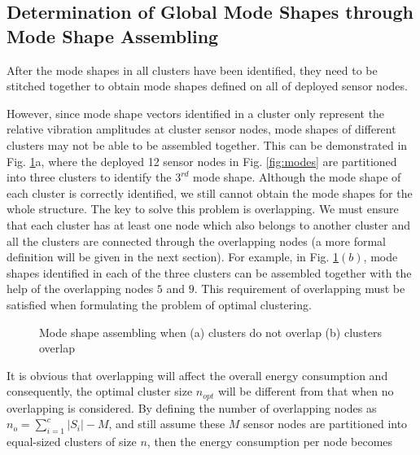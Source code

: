 \subsection{Determination of Global Mode Shapes through Mode Shape Assembling}
After the mode shapes in all clusters have been identified, they need to be stitched together to obtain mode shapes defined on all of deployed sensor nodes. 

However, since mode shape vectors identified in a cluster only represent the relative vibration amplitudes at cluster sensor nodes, mode shapes of different clusters may not be able to be assembled together. This can be demonstrated in Fig. \ref{fig:TwoTypesClustering}a, where the deployed 12 sensor nodes in Fig. \ref{fig:modes} are partitioned into three clusters to identify the \(3^{rd}\) mode shape.  Although the mode shape of each cluster is correctly identified, we still cannot obtain the mode shapes for the whole structure. The key to solve this problem is overlapping.  We must ensure that each cluster has at least one node which also belongs to another cluster and all the clusters are connected through the overlapping nodes (a more formal definition will be given in the next section).  For example, in Fig. \ref{fig:TwoTypesClustering}\((b)\), mode shapes identified in each of the three clusters can be assembled together with the help of the overlapping nodes \(5\) and \(9\). This requirement of overlapping must be satisfied when formulating the problem of optimal clustering.

\begin{figure}
\centering
\subfloat[]{\label{fig:NonOverlapClusterBeam}
\texttt{[image: NonOverlapClusterBeam]}}
\subfloat[]{\label{fig:OverlapClusterBeam}
\texttt{[image: OverlapClusterBeam]}}
\caption{Mode shape assembling when (a) clusters do not overlap (b) clusters overlap}
\label{fig:TwoTypesClustering}
\end{figure}

It is obvious that overlapping will affect the overall energy consumption and consequently, the optimal cluster size \(n_{opt}\) will be different from that when no overlapping is considered.  By defining the number of overlapping nodes as \(n_o = \sum\limits_{i=1}^c\left|S_i\right| - M\), and still assume these \(M\) sensor nodes are partitioned into equal-sized clusters of size \(n\), then the energy consumption per node becomes

